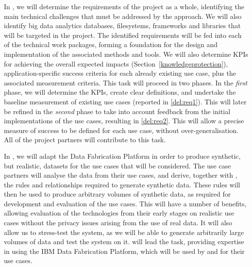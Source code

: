 \begin{Workpackage}{\thewpno}
\begin{Task}
\TaskResults{%
\ref{del:req1},
\ref{del:req2}
}
\TaskHeader{}
In \theTask{}, we will determine the requirements of the \TheProject{} project as a whole, identifying the main technical challenges that must be addressed by the \TheProject{} approach. We will also identify big data analytics databases, filesystems, frameworks and libraries that will be targeted in the project. The identified  requirements will be fed into each of the technical work packages, forming a foundation for the design and implementation of the associated methods and tools. We will also determine KPIs for achieving the overall expected impacts (Section~\ref{knowledgeprotection}), application-specific success criteria for each already existing use case, plus the associated measurement criteria. 
This task will proceed in two phases. In the \emph{first} phase, we will determine the KPIs, create clear definitions, and undertake the baseline measurement of existing use cases (reported in \ref{del:req1}). This will later be refined in the \emph{second} phase to take into account feedback from the initial implementations of the use cases, resulting in \ref{del:req2}. This will allow a precise measure of success to be defined for each use case, without over-generalisation. All of the project partners will contribute to this task.
\end{Task}

\begin{Task}
\TaskResults{%
\ref{del:eval1},
\ref{del:eval2},
\ref{del:eval3}
}
\TaskHeader{}
In \theTask{}, we will adapt the \IBMshort{} Data Fabrication Platform in order to produce synthetic, but realistic, datasets for the use cases that will be considered. The use case partners will analyse the data from their use cases, and derive, together with \IBMshort{}, the rules and relationships required to generate synthetic data. These rules will then be used to produce arbitrary volumes of synthetic data, as required for development and evaluation of the use cases. This will have a number of benefits, allowing evaluation of the \TheProject{} technologies from their early stages on realistic use cases without the privacy issues arising from the use of real data. It will also allow us to stress-test the system, as we will be able to generate arbitrarily large volumes of data and test the system on it. \IBMshort{} will lead the task, providing expertise in using the IBM Data Fabrication Platform, which will be used by \FRQshort{} and \SOPRAshort{} for their use cases.
\end{Task}


\end{Workpackage}
